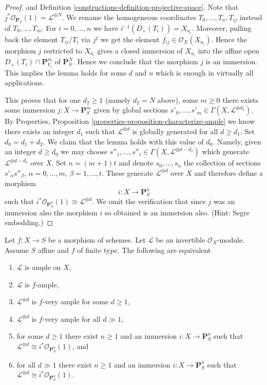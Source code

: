 \begin{proof}
and Definition \ref{constructions-definition-projective-space}.
Note that $j^*\mathcal{O}_{\mathbf{P}_S}(1) = \mathcal{L}^{\otimes N}$.
We rename the homogeneous coordinates $T_0, \ldots, T_n, T_{ij}$
instead of $T_0, \ldots, T_m$.
For $i = 0, \ldots, n$ we have $i^{-1}(D_{+}(T_i)) = X_{a_i}$.
Moreover, pulling back the element $T_{ij}/T_i$ via $j^\sharp$ we
get the element $f_{ij} \in \mathcal{O}_X(X_{a_i})$.
Hence the morphism $j$ restricted to $X_{a_i}$
gives a closed immersion of $X_{a_i}$ into the affine open
$D_{+}(T_i) \cap \mathbf{P}^m_{V_i}$ of $\mathbf{P}^N_S$.
Hence we conclude that the morphism $j$ is an immersion.
This implies the lemma holds for some $d$ and $n$ which is enough
in virtually all applications.

\medskip\noindent
This proves that for one $d_2 \geq 1$
(namely $d_2 = N$ above), some $m \geq 0$ there exists some
immersion $j : X \to \mathbf{P}^m_S$ given by global sections
$s'_0, \ldots, s'_m \in \Gamma(X, \mathcal{L}^{\otimes d_2})$.
By Properties, Proposition \ref{properties-proposition-characterize-ample}
we know there exists an integer
$d_1$ such that $\mathcal{L}^{\otimes d}$ is globally generated
for all $d \geq d_1$. Set $d_0 = d_1 + d_2$. We claim that
the lemma holds with this value of $d_0$. Namely, given
an integer $d \geq d_0$ we may choose $s''_1, \ldots, s''_t
\in \Gamma(X, \mathcal{L}^{\otimes d - d_2})$ which generate
$\mathcal{L}^{\otimes d - d_2}$ over $X$. Set $n = (m + 1)t$ and
denote $s_0, \ldots, s_n$ the collection of sections
$s'_\alpha s''_\beta$, $\alpha = 0, \ldots, m$, 
$\beta = 1, \ldots, t$. These generate $\mathcal{L}^{\otimes d}$
over $X$ and therefore define a morphism
$$
i : X \longrightarrow \mathbf{P}^n_S
$$
such that $i^*\mathcal{O}_{\mathbf{P}^n_S}(1) \cong \mathcal{L}^{\otimes d}$.
We omit the verification that since $j$ was an immersion
also the morphism $i$ so obtained is an immersion also.
(Hint: Segre embedding.)
\end{proof}

\begin{lemma}
\label{lemma-finite-type-over-affine-ample-very-ample}
Let $f : X \to S$ be a morphism of schemes.
Let $\mathcal{L}$ be an invertible $\mathcal{O}_X$-module.
Assume $S$ affine and $f$ of finite type.
The following are equivalent
\begin{enumerate}
\item $\mathcal{L}$ is ample on $X$,
\item $\mathcal{L}$ is $f$-ample,
\item $\mathcal{L}^{\otimes d}$ is $f$-very ample for some $d \geq 1$,
\item $\mathcal{L}^{\otimes d}$ is $f$-very ample for all $d \gg 1$,
\item for some $d \geq 1$ there exist $n \geq 1$ and an immersion
$i : X \to \mathbf{P}^n_S$ such that
$\mathcal{L}^{\otimes d} \cong i^*\mathcal{O}_{\mathbf{P}^n_S}(1)$, and
\item for all $d \gg 1$ there exist $n \geq 1$ and an immersion
$i : X \to \mathbf{P}^n_S$ such that
$\mathcal{L}^{\otimes d} \cong i^*\mathcal{O}_{\mathbf{P}^n_S}(1)$.
\end{enumerate}
\end{lemma}

